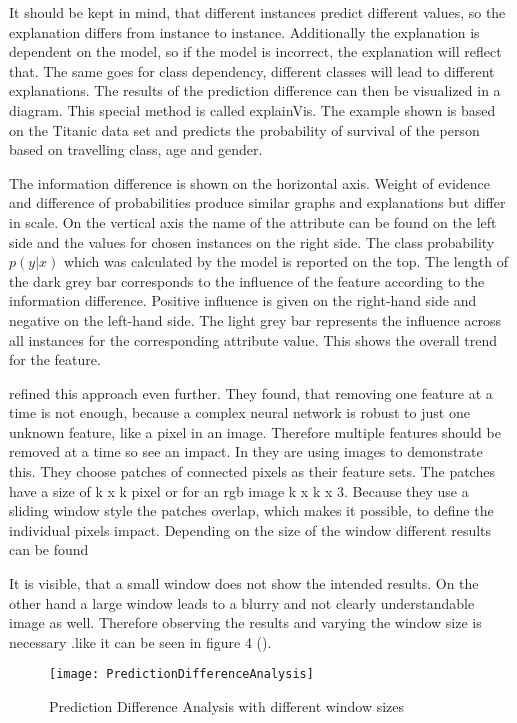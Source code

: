 It should be kept in mind, that different instances predict different values, so the explanation differs from instance to instance. Additionally the explanation is dependent on the model, so if the model is incorrect, the explanation will reflect that. The same goes for class dependency, different classes will lead to different explanations.
The results of the prediction difference can then be visualized in a diagram. This special method is called explainVis. The example shown is based on the Titanic data set and predicts the probability of survival of the person based on travelling class, age and gender.
\par
The information difference is shown on the horizontal axis. Weight of evidence and difference of probabilities produce similar graphs and explanations but differ in scale. On the vertical axis the name of the attribute can be found on the left side and the values for chosen instances on the right side. The class probability 
\(p(y|x)\)
 which was calculated by the model is reported on the top.
The length of the dark grey bar corresponds to the influence of the feature according to the information difference. Positive influence is given on the right-hand side and negative on the left-hand side. The light grey bar represents the influence across all instances for the corresponding attribute value. This shows the overall trend for the feature.
\par
{} refined this approach even further. They found, that removing one feature at a time is not enough, because a complex neural network is robust to just one unknown feature, like a pixel in an image. Therefore multiple features should be removed at a time so see an impact. In \cite{Zintgraf.2017} they are using images to demonstrate this. They choose patches of connected pixels as their feature sets. The patches have a size of k x k pixel or for an rgb image k x k x 3. Because they use a sliding window style the patches overlap, which makes it possible, to define the individual pixels impact. Depending on the size of the window different results can be found 
\par
It is visible, that a small window does not show the intended results. On the other hand a large window leads to a blurry and not clearly understandable image as well. Therefore observing the results and varying the window size is necessary .like it can be seen in figure 4 (\cite{Zintgraf.2017}). 
\begin{figure*}[h]
    \center
    \texttt{[image: PredictionDifferenceAnalysis]}
    \caption{Prediction Difference Analysis with different window sizes}
\end{figure*}

